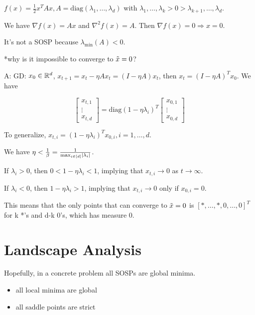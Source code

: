 \begin{eg}
    \(f(x) = \frac{1}{2} x^T A x, A = \text{diag}(\lambda_1, \ldots, \lambda_d)\) with 
    \(\lambda_1, \ldots, \lambda_k > 0 > \lambda_{k+1}, \ldots, \lambda_d\). 

    We have \(\nabla f(x) = Ax\) and \(\nabla^2 f(x) = A\). Then 
    \(\nabla f(x) = 0 \Rightarrow x = 0\). 

    It's not a SOSP because \(\lambda_{\text{min}}(A) < 0\). 

*why is it impossible to converge to \(\tilde{x} = 0\)? 

A: GD: \(x_0 \in \mathbb{R}^d\), \(x_{t+1} = x_t - \eta A x_t = (I - \eta A)x_t\), then 
\(x_t = (I - \eta A)^T x_0\). We have 

\[
    \begin{bmatrix}
        x_{t,1} \\ 
        \vdots \\ 
        x_{t, d}
    \end{bmatrix} = \text{diag}(1 - \eta \lambda_i)^T \begin{bmatrix}
        x_{0,1} \\ 
        \vdots \\ 
        x_{0, d}
    \end{bmatrix}
\]

To generalize, \(x_{t, i} = (1 - \eta \lambda_i)^T x_{0,i}, i = 1, \ldots, d\). 

We have \(\eta < \frac{1}{\beta} = \frac{1}{\max_{i \in [d]} \lvert \lambda_i \rvert}\). 

If \(\lambda_i > 0\), then \(0 < 1 - \eta \lambda_i < 1\), implying that \(x_{t,i} \to 0\)
as \(t \to \infty\). 

If \(\lambda_i < 0\), then \(1 - \eta \lambda_i > 1\), implying that \(x_{t,i}\to 0\)
only if \(x_{0, i} = 0\). 

This means that the only points that can converge to \(\tilde{x} = 0\) is 
\([*, \ldots, *, 0, \ldots, 0]^T\) for k *'s and d-k 0's, which has measure 0. 


\end{eg}


\section{Landscape Analysis}

Hopefully, in a concrete problem all SOSPs are global minima. 

\begin{itemize}
    \item all local minima are global 
    \item all saddle points are strict
\end{itemize}


